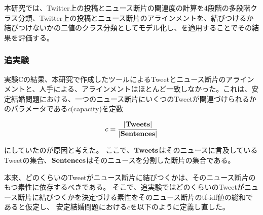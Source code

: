 \documentclass[12pt]{jarticle}
\begin{document}
本研究では、Twitter上の投稿とニュース断片の関連度の計算を4段階の多段階クラス分類、Twitter上の投稿とニュース断片のアラインメントを、結びつけるか結びつけないかの二値のクラス分類としてモデル化し、\kappac を適用することでその結果を評価する。




\subsubsection{追実験}
\label{additional_expr}

実験Cの結果、本研究で作成したツールによるTweetとニュース断片のアラインメントと、人手による、アラインメントはほとんど一致しなかった。これは、安定結婚問題における、一つのニュース断片にいくつのTweetが関連づけられるかのパラメータである$c$(capacity)を定数

\begin{equation}
  c = \frac{ |\bf{Tweets}| }{ |\bf{Sentences}| }
\end{equation}

にしていたのが原因と考えた。
ここで、$\bf{Tweets}$はそのニュースに言及しているTweetの集合、$\bf{Sentences}$はそのニュースを分割した断片の集合である。

本来、どのくらいのTweetがニュース断片に結びつくかは、そのニュース断片のもつ素性に依存するべきである。
そこで、追実験ではどのくらいのTweetがニュース断片に結びつくかを決定づける素性をそのニュース断片のtf-idf値の総和であると仮定し、
安定結婚問題における$c$を以下のように定義し直した。
\end{document}

